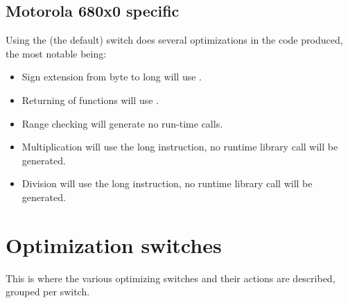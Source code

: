 \subsection{Motorola 680x0 specific}

Using the  (the default) switch does several optimizations 
in the code produced, the most notable being:

\begin{itemize}
\item Sign extension from byte to long will use .
\item Returning of functions will use .
\item Range checking will generate no run-time calls.
\item Multiplication will use the long  instruction, no
runtime library call will be generated.
\item Division will use the long  instruction, no
runtime library call will be generated.
\end{itemize}

\section{Optimization switches}
This is where the various optimizing switches and their actions are
described, grouped per switch.

